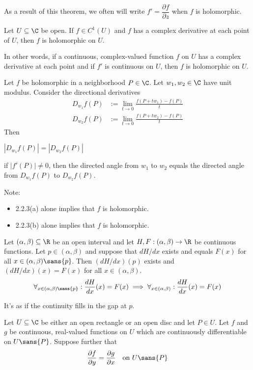 As a result of this theorem, we often will write $f'=\dfrac{\partial
  f}{\partial z}$ when $f$ is holomorphic.

\label{d037b0f}

Let $U\subseteq\C$ be open. If $f\in C^1(U)$ and $f$ has a complex derivative
at each point of $U$, then $f$ is holomorphic on $U$.

In other words, if a continuous, complex-valued function $f$ on $U$ has a
complex derivative at each point and if $f'$ is continuous on $U$, then $f$ is
holomorphic on $U$.

\label{c41052e}

Let $f$ be holomorphic in a neighborhood $P\in\C$. Let $w_1,w_2\in\C$ have unit
modulus. Consider the directional derivatives
\begin{align*}
  D_{w_1}f(P) & :=\lim_{t\to0}\frac{f(P+tw_1)-f(P)}t \\
  D_{w_2}f(P) & :=\lim_{t\to0}\frac{f(P+tw_2)-f(P)}t
\end{align*}
Then
\begin{enumerata}
  \item $|D_{w_1}f(P)|=|D_{w_2}f(P)|$
  \item if $|f'(P)|\neq0$, then the directed angle from $w_1$ to $w_2$ equals the
  directed angle from $D_{w_1}f(P)$ to $D_{w_2}f(P)$.
\end{enumerata}
Note:
\begin{itemize}
  \item 2.2.3(a) alone implies that $f$ is holomorphic.
  \item 2.2.3(b) alone implies that $f$ is holomorphic.
\end{itemize}

\label{f8abd8b}

Let $(\alpha,\beta)\subseteq\R$ be an open interval and let
$H,F:(\alpha,\beta)\to\R$ be continuous functions. Let $p\in(\alpha,\beta)$ and
suppose that $dH/dx$ exists and equals $F(x)$ for all
$x\in(\alpha,\beta)\sans{p}$. Then $(dH/dx)(p)$ exists and $(dH/dx)(x)=F(x)$
for all $x\in(\alpha,\beta)$.
$$
  \forall_{x\in(\alpha,\beta)\sans{p}}:\frac{dH}{dx}(x)=F(x)\implies
  \forall_{x\in(\alpha,\beta)}:\frac{dH}{dx}(x)=F(x)
$$

It's as if the continuity fills in the gap at $p$.

\label{f017dd0}

Let $U\subseteq\C$ be either an open rectangle or an open disc and let $P\in
U$. Let $f$ and $g$ be continuous, real-valued functions on $U$ which are
continuously differentiable on $U\sans{P}$. Suppose further that
$$
  \frac{\partial f}{\partial y}=\frac{\partial g}{\partial x}
  \quad\text{on }U\sans{P}
$$

